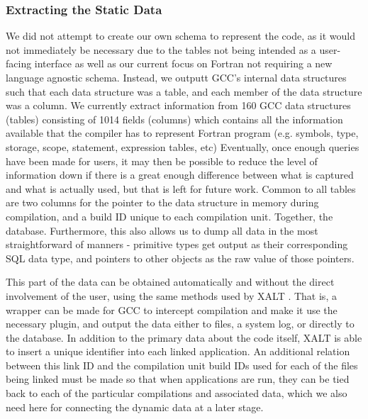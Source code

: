 \subsubsection{Extracting the Static Data}
We did not attempt to create our own schema to represent the code, as it would not immediately be 
necessary due to the tables not being intended as a user-facing interface as well as our current 
focus 
on Fortran not requiring a new language agnostic schema.
Instead, we outputt \acs{GCC}'s internal data structures such that each data structure 
was a table, and each member of the data structure was a column.
We currently extract information from 160 \acs{GCC} data structures (tables) consisting of 1014 
fields (columns) which contains all the information available that the compiler has to represent Fortran program (e.g. symbols, type, storage, scope, statement, expression tables, etc)
Eventually, once enough queries have been made for users, it may then be possible to reduce the 
level of information down if there is a great enough difference between what is captured and what is 
actually used, but that is left for future work.
Common to all tables are two columns for the pointer to the data structure in memory during 
compilation, and a build ID unique to each compilation unit.
Together, 
the database.
Furthermore, this also allows us to dump all data in the most straightforward of manners - primitive 
types get output as their corresponding \acs{SQL} data type, and pointers to other objects as the 
raw value of those pointers.

This part of the data can be obtained automatically and without the direct involvement of the user, 
using the same methods used by XALT \cite{7081224}.
That is, a wrapper can be made for \acs{GCC} to intercept compilation and make it use the 
necessary 
plugin, and output the data either to files, a system log, or directly to the database.
In addition to the primary data about the code itself, XALT is able to insert a unique identifier into 
each 
linked application.
An additional relation between this link ID and the compilation unit build IDs used for each of the files 
being linked must be made so that when applications are run, they can be tied back to each of the 
particular compilations and associated data, which we also need here for connecting the dynamic 
data at a later stage.
